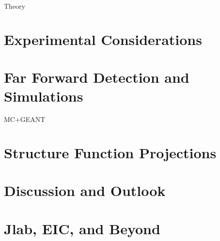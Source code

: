 \documentclass[
]{report}
\begin{document}
Theory

\hypertarget{Section-9.3}{%
\section{Experimental Considerations}\label{Section-9.3}}

\hypertarget{Section-9.4}{%
\section{Far Forward Detection and Simulations}\label{Section-9.4}}

MC+GEANT

\hypertarget{Section-9.5}{%
\section{Structure Function Projections}\label{Section-9.5}}

\hypertarget{Section-9.6}{%
\section{Discussion and Outlook}\label{Section-9.6}}

\label{Chapter-10}

\hypertarget{Section-10.1}{%
\section{Jlab, EIC, and Beyond}\label{Section-10.1}}
\end{document}

